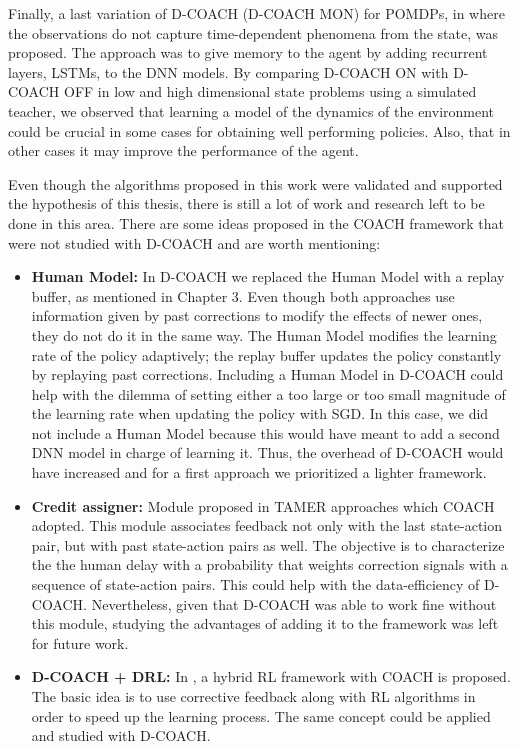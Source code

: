Finally, a last variation of D-COACH (D-COACH MON) for POMDPs, in where the observations do not capture time-dependent phenomena from the state, was proposed. The approach was to give memory to the agent by adding recurrent layers, LSTMs, to the DNN models. By comparing D-COACH ON with D-COACH OFF in low and high dimensional state problems using a simulated teacher, we observed that learning a model of the dynamics of the environment could be crucial in some cases for obtaining well performing policies. Also, that in other cases it may improve the performance of the agent. 

Even though the algorithms proposed in this work were validated and supported the hypothesis of this thesis, there is still a lot of work and research left to be done in this area. There are some ideas proposed in the COACH framework that were not studied with D-COACH and are worth mentioning:

\begin{itemize}
    \item \textbf{Human Model:} In D-COACH we replaced the Human Model with a replay buffer, as mentioned in Chapter 3. Even though both approaches use information given by past corrections to modify the effects of newer ones, they do not do it in the same way. The Human Model modifies the learning rate of the policy adaptively; the replay buffer updates the policy constantly by replaying past corrections. Including a Human Model in D-COACH could help with the dilemma of setting either a too large or too small magnitude of the learning rate when updating the policy with SGD. In this case, we did not include a Human Model because this would have meant to add a second DNN model in charge of learning it. Thus, the overhead of D-COACH would have increased and for a first approach we prioritized a lighter framework.
    \item \textbf{Credit assigner:} Module proposed in TAMER approaches \cite{Knox:2009:ISA:1597735.1597738} which COACH adopted. This module associates feedback not only with the last state-action pair, but with past state-action pairs as well. The objective is to characterize the the human delay with a probability that weights correction signals with a sequence of state-action pairs. This could help with the data-efficiency of D-COACH. Nevertheless, given that D-COACH was able to work fine without this module, studying the advantages of adding it to the framework was left for future work. 
    \item \textbf{D-COACH + DRL:} In \cite{celemin2018fast}, a hybrid RL framework with COACH is proposed. The basic idea is to use corrective feedback along with RL algorithms in order to speed up the learning process. The same concept could be applied and studied with D-COACH. 
\end{itemize}

